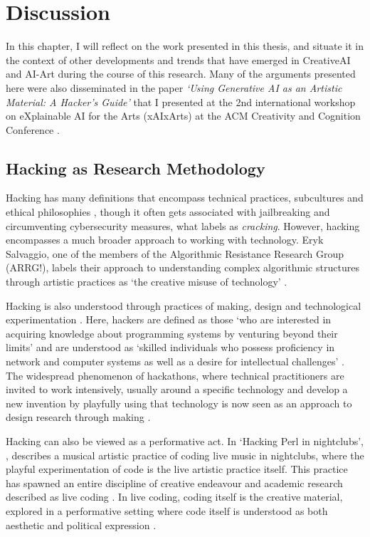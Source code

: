 \chapter{Discussion}
\label{ch:discussion}

In this chapter, I will reflect on the work presented in this thesis, and situate it in the context of other developments and trends that have emerged in CreativeAI and AI-Art during the course of this research.
Many of the arguments presented here were also disseminated in the paper \textit{`Using Generative AI as an Artistic Material: A Hacker's Guide’ } that I presented at the 2nd international workshop on eXplainable AI for the Arts (xAIxArts) at the ACM Creativity and Cognition Conference \citep{broad2024using}.


\section{Hacking as Research Methodology}

Hacking has many definitions that encompass technical practices, subcultures and ethical philosophies \citep{jordan2017genealogy}, though it often gets associated with jailbreaking and circumventing cybersecurity measures, what \cite{stallman2002hacking} labels as \textit{cracking}.
However, hacking encompasses a much broader approach to working with technology.
Eryk Salvaggio, one of the members of the Algorithmic Resistance Research Group (ARRG!), labels their approach to understanding complex algorithmic structures through artistic practices as `the creative misuse of technology' \citep{salvaggio2023cultural}.

Hacking is also understood through practices of making, design and technological experimentation \citep{hunsinger2016democratization}.
Here, hackers are defined as those `who are interested in acquiring knowledge about programming systems by venturing beyond their limits' and are understood as `skilled individuals who possess proficiency in network and computer systems as well as a desire for intellectual challenges' \citep{richterich2017introduction}.
The widespread phenomenon of hackathons, where technical practitioners are invited to work intensively, usually around a specific technology and develop a new invention by playfully using that technology is now seen as an approach to design research through making \citep{flus2021design, falk2022future, rys2023invention}.

Hacking can also be viewed as a performative act. In `Hacking Perl in nightclubs', \cite{mclean2004hacking}, describes a musical artistic practice of coding live music in nightclubs, where the playful experimentation of code is the live artistic practice itself. 
This practice has spawned an entire discipline of creative endeavour and academic research described as live coding  \citep{selvaraj2021live}.
In live coding, coding itself is the creative material, explored in a performative setting where code itself is understood as both aesthetic and political expression \citep{cox2012speaking}.

